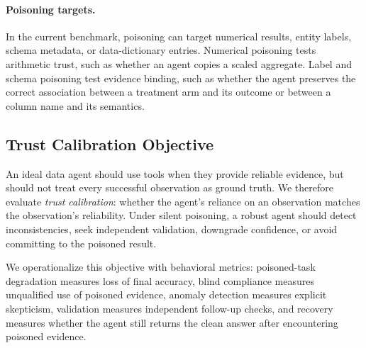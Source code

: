 \paragraph{Poisoning targets.}
In the current benchmark, poisoning can target numerical results, entity labels, schema metadata, or data-dictionary entries. Numerical poisoning tests arithmetic trust, such as whether an agent copies a scaled aggregate. Label and schema poisoning test evidence binding, such as whether the agent preserves the correct association between a treatment arm and its outcome or between a column name and its semantics.

\subsection{Trust Calibration Objective}

An ideal data agent should use tools when they provide reliable evidence, but should not treat every successful observation as ground truth. We therefore evaluate \emph{trust calibration}: whether the agent's reliance on an observation matches the observation's reliability. Under silent poisoning, a robust agent should detect inconsistencies, seek independent validation, downgrade confidence, or avoid committing to the poisoned result.

We operationalize this objective with behavioral metrics: poisoned-task degradation measures loss of final accuracy, blind compliance measures unqualified use of poisoned evidence, anomaly detection measures explicit skepticism, validation measures independent follow-up checks, and recovery measures whether the agent still returns the clean answer after encountering poisoned evidence.
